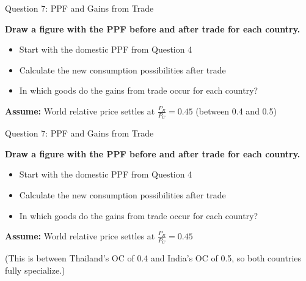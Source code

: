 \documentclass{beamer}
\begin{document}
\begin{frame}{Question 7: PPF and Gains from Trade}

\textbf{Draw a figure with the PPF before and after trade for each country.}

\vspace{0.3cm}

\begin{itemize}
    \item Start with the domestic PPF from Question 4
    \item Calculate the new consumption possibilities after trade
    \item In which goods do the gains from trade occur for each country?
\end{itemize}

\vspace{0.5cm}

\textbf{Assume:} World relative price settles at $\frac{P_R}{P_C} = 0.45$ (between 0.4 and 0.5)

\end{frame}



\begin{frame}{Question 7: PPF and Gains from Trade}

\textbf{Draw a figure with the PPF before and after trade for each country.}

\vspace{0.3cm}

\begin{itemize}
    \item Start with the domestic PPF from Question 4
    \item Calculate the new consumption possibilities after trade
    \item In which goods do the gains from trade occur for each country?
\end{itemize}

\vspace{0.5cm}

\textbf{Assume:} World relative price settles at $\frac{P_R}{P_C} = 0.45$ 

\vspace{0.2cm}

\small{(This is between Thailand's OC of 0.4 and India's OC of 0.5, so both countries fully specialize.)}

\end{frame}
\end{document}
